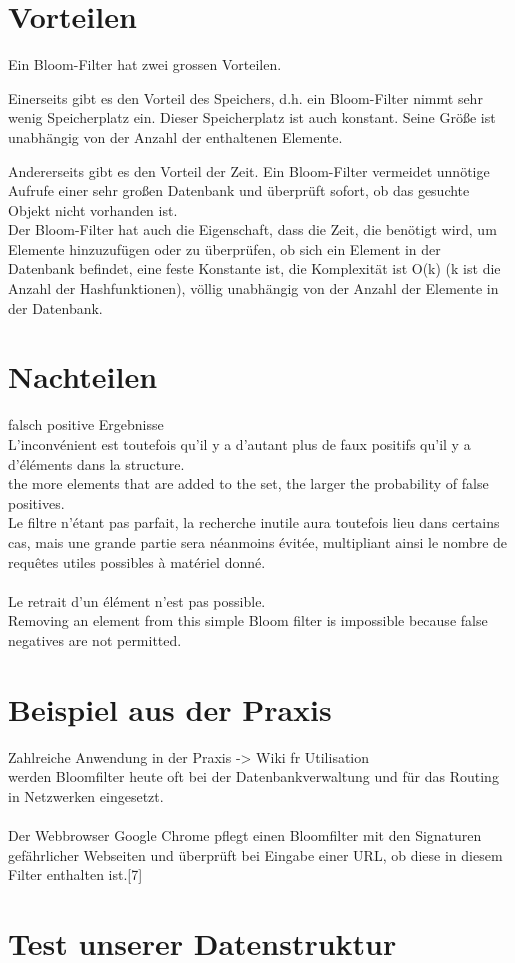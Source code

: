 \documentclass[12pt, letterpaper]{article}
\begin{document}
\section{Vorteilen}

Ein Bloom-Filter hat zwei grossen Vorteilen.

Einerseits gibt es den Vorteil des Speichers, d.h. ein Bloom-Filter nimmt sehr wenig Speicherplatz ein. Dieser Speicherplatz ist auch konstant. Seine Größe ist unabhängig von der Anzahl der enthaltenen Elemente.

Andererseits gibt es den Vorteil der Zeit. Ein Bloom-Filter vermeidet unnötige Aufrufe einer sehr großen Datenbank und überprüft sofort, ob das gesuchte Objekt nicht vorhanden ist.\\
Der Bloom-Filter hat auch die Eigenschaft, dass die Zeit, die benötigt wird, um Elemente hinzuzufügen oder zu überprüfen, ob sich ein Element in der Datenbank befindet, eine feste Konstante ist, die Komplexität ist O(k) (k ist die Anzahl der Hashfunktionen), völlig unabhängig von der Anzahl der Elemente in der Datenbank.

\section{Nachteilen}

falsch positive Ergebnisse\\
L'inconvénient est toutefois qu'il y a d'autant plus de faux positifs qu'il y a d'éléments dans la structure.\\
the more elements that are added to the set, the larger the probability of false positives.\\
Le filtre n'étant pas parfait, la recherche inutile aura toutefois lieu dans certains cas, mais une grande partie sera néanmoins évitée, multipliant ainsi le nombre de requêtes utiles possibles à matériel donné.\\
\\
Le retrait d'un élément n'est pas possible.\\
Removing an element from this simple Bloom filter is impossible because false negatives are not permitted.\\

\section{Beispiel aus der Praxis}

Zahlreiche Anwendung in der Praxis -> Wiki fr Utilisation\\
werden Bloomfilter heute oft bei der Datenbankverwaltung und für das Routing in Netzwerken eingesetzt.\\
\\
Der Webbrowser Google Chrome pflegt einen Bloomfilter mit den Signaturen gefährlicher Webseiten und überprüft bei Eingabe einer URL, ob diese in diesem Filter enthalten ist.[7]\\

\section{Test unserer Datenstruktur}
\end{document}
